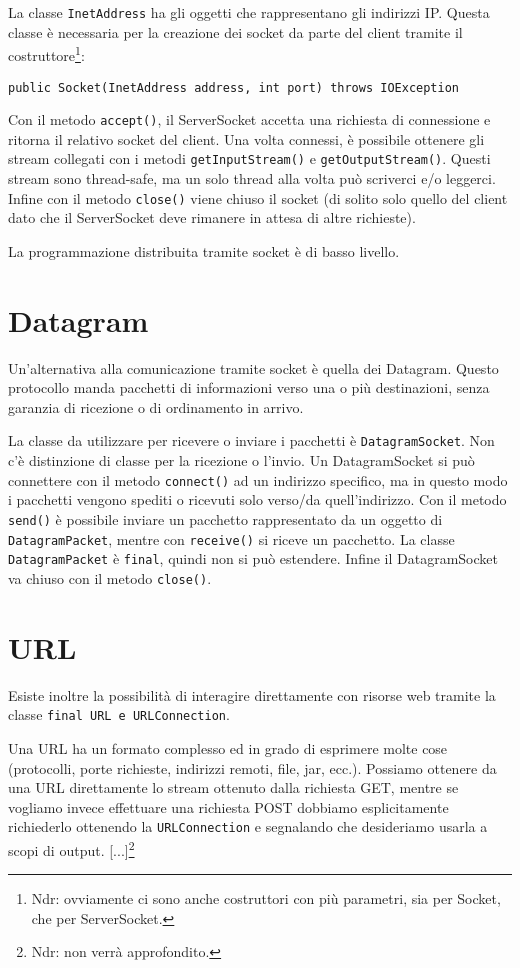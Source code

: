 La classe \texttt{InetAddress} ha gli oggetti che rappresentano gli indirizzi IP. Questa classe è necessaria per la creazione dei socket da parte del client tramite il costruttore\footnote{Ndr: ovviamente ci sono anche costruttori con più parametri, sia per Socket, che per ServerSocket.}:
\begin{lstlisting}
public Socket(InetAddress address, int port) throws IOException
\end{lstlisting}
Con il metodo \texttt{accept()}, il ServerSocket accetta una richiesta di connessione e ritorna il relativo socket del client. Una volta connessi, è possibile ottenere gli stream collegati con i metodi \texttt{getInputStream()} e \texttt{getOutputStream()}. Questi stream sono thread-safe, ma un solo thread alla volta può scriverci e/o leggerci. Infine con il metodo \texttt{close()} viene chiuso il socket (di solito solo quello del client dato che il ServerSocket deve rimanere in attesa di altre richieste). 

La programmazione distribuita tramite socket è di basso livello.

\section{Datagram}
Un'alternativa alla comunicazione tramite socket è quella dei Datagram. Questo protocollo manda pacchetti di informazioni verso una o più destinazioni, senza garanzia di ricezione o di ordinamento in arrivo. 

La classe da utilizzare per ricevere o inviare i pacchetti è \texttt{DatagramSocket}. Non c'è distinzione di classe per la ricezione o l'invio. Un DatagramSocket si può connettere con il metodo \texttt{connect()} ad un indirizzo specifico, ma in questo modo i pacchetti vengono spediti o ricevuti solo verso/da quell'indirizzo. Con il metodo \texttt{send()} è possibile inviare un pacchetto rappresentato da un oggetto di \texttt{DatagramPacket}, mentre con \texttt{receive()} si riceve un pacchetto. La classe \texttt{DatagramPacket} è \texttt{final}, quindi non si può estendere. Infine il DatagramSocket va chiuso con il metodo \texttt{close()}.

\section{URL}
Esiste inoltre la possibilità di interagire direttamente con risorse web tramite la classe \texttt{final URL e URLConnection}.

Una URL ha un formato complesso ed in grado di esprimere molte cose (protocolli, porte richieste, indirizzi remoti, file, jar, ecc.). Possiamo ottenere da una URL direttamente lo stream ottenuto dalla richiesta GET, mentre se vogliamo invece effettuare una richiesta POST dobbiamo esplicitamente richiederlo ottenendo la \texttt{URLConnection} e segnalando che desideriamo usarla a scopi di output. [...]\footnote{Ndr: non verrà approfondito.}

